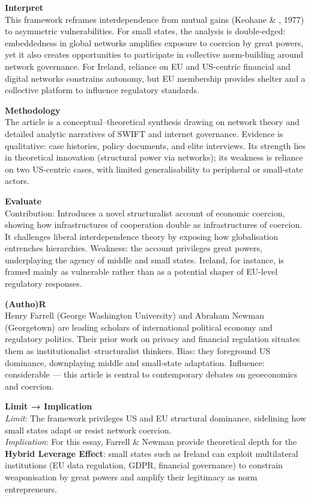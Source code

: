 \textbf{Interpret} \\
This framework reframes interdependence from mutual gains (Keohane \& , 1977) to asymmetric vulnerabilities. For small states, the analysis is double-edged: embeddedness in global networks amplifies exposure to coercion by great powers, yet it also creates opportunities to participate in collective norm-building around network governance. For Ireland, reliance on EU and US-centric financial and digital networks constrains autonomy, but EU membership provides shelter and a collective platform to influence regulatory standards.

\textbf{Methodology} \\
The article is a conceptual–theoretical synthesis drawing on network theory and detailed analytic narratives of SWIFT and internet governance. Evidence is qualitative: case histories, policy documents, and elite interviews. Its strength lies in theoretical innovation (structural power via networks); its weakness is reliance on two US-centric cases, with limited generalisability to peripheral or small-state actors.

\textbf{Evaluate} \\
Contribution: Introduces a novel structuralist account of economic coercion, showing how infrastructures of cooperation double as infrastructures of coercion. It challenges liberal interdependence theory by exposing how globalisation entrenches hierarchies. Weakness: the account privileges great powers, underplaying the agency of middle and small states. Ireland, for instance, is framed mainly as vulnerable rather than as a potential shaper of EU-level regulatory responses.

\textbf{(Autho)R} \\
Henry Farrell (George Washington University) and Abraham Newman (Georgetown) are leading scholars of international political economy and regulatory politics. Their prior work on privacy and financial regulation situates them as institutionalist–structuralist thinkers. Bias: they foreground US dominance, downplaying middle and small-state adaptation. Influence: considerable — this article is central to contemporary debates on geoeconomics and coercion.

\textbf{Limit → Implication} \\
\textit{Limit}: The framework privileges US and EU structural dominance, sidelining how small states adapt or resist network coercion. \\
\textit{Implication}: For this essay, Farrell \& Newman provide theoretical depth for the \textbf{Hybrid Leverage Effect}: small states such as Ireland can exploit multilateral institutions (EU data regulation, GDPR, financial governance) to constrain weaponisation by great powers and amplify their legitimacy as norm entrepreneurs.

